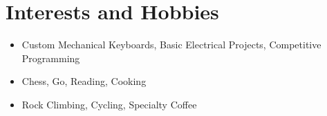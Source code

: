 \documentclass[a4paper,12pt]{article}
\begin{document}
\section{Interests and Hobbies}
\begin{itemize}[topsep=2pt,itemsep=2pt,partopsep=2pt, parsep=2pt]
   \item Custom Mechanical Keyboards, Basic Electrical Projects, Competitive Programming
   \item Chess, Go, Reading, Cooking
   \item Rock Climbing, Cycling, Specialty Coffee
\end{itemize}
\end{document}
